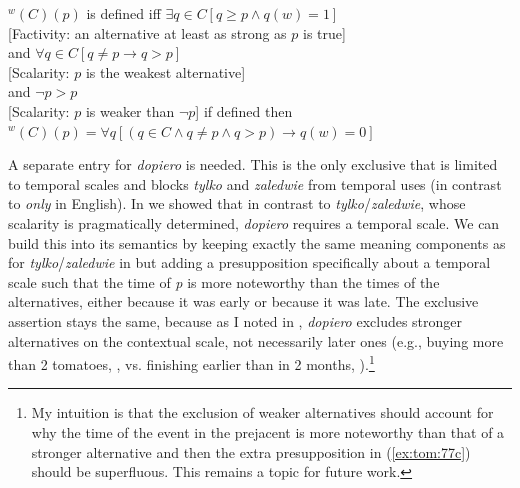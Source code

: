 \documentclass[output=paper,colorlinks,citecolor=brown]{langscibook}
\begin{document}

\ea\label{ex:tom:76}
$^w(C)(p)$ is defined iff
\ea $\exists q\in C [q\geq p\wedge q(w) = 1]$\label{ex:tom:76a}\\{[Factivity: an alternative at least as strong as $p$ is true]}\smallskip\\   
and
\ex $\forall q\in C [q\neq p → q > p]$\label{ex:tom:76b}\\{[Scalarity: $p$ is the weakest alternative]}\smallskip\\
and
\ex $¬p > p$\label{ex:tom:76c}\\
{[Scalarity: $p$ is weaker than $¬p$]}\smallskip
\z
if defined then\\
$^w(C)(p) =\forall q[(q\in C\wedge q\neq p\wedge q > p) → q (w) = 0]$ 
\z 

\noindent A separate entry for \textit{dopiero} is needed. This is the only exclusive that is limited to temporal scales and blocks \textit{tylko} and \textit{zaledwie} from temporal uses (in contrast to \textit{only} in English). In  we showed that in contrast to \textit{tylko}/\textit{zaledwie}, whose scalarity is pragmatically determined, \textit{dopiero} requires a temporal scale. We can build this into its semantics by keeping exactly the same meaning components as for \textit{tylko}/\textit{zaledwie} in  but adding a presupposition specifically about a temporal scale such that the time of \textit{p} is more noteworthy than the times of the alternatives, either because it was early or because it was late. The exclusive assertion stays the same, because as I noted in , \textit{dopiero} excludes stronger alternatives on the contextual scale, not necessarily later ones (e.g., buying more than 2 tomatoes, , vs. finishing earlier than in 2 months, ).\footnote{My intuition is that the exclusion of weaker alternatives should account for why the time of the event in the prejacent is more noteworthy than that of a stronger alternative and then the extra presupposition in (\ref{ex:tom:77c}) should be superfluous. This remains a topic for future work.}
\end{document}
